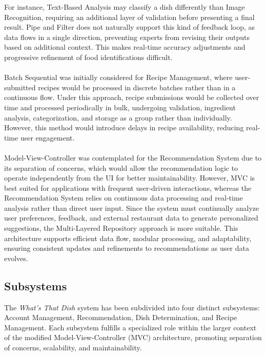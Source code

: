 \documentclass[]{article}
\begin{document}
For instance, Text-Based Analysis may classify a dish differently than Image Recognition, requiring an additional layer of validation before presenting a final result. 
Pipe and Filter does not naturally support this kind of feedback loop, as data flows in a single direction, preventing experts from revising their outputs based on additional context.
This makes real-time accuracy adjustments and progressive refinement of food identifications difficult.
\\
\\
Batch Sequential was initially considered for Recipe Management, where user-submitted recipes would be processed in discrete batches rather than in a continuous flow. 
Under this approach, recipe submissions would be collected over time and processed periodically in bulk, undergoing validation, ingredient analysis, categorization, and storage as a group rather than individually. 
However, this method would introduce delays in recipe availability, reducing real-time user engagement. 
\\
\\
Model-View-Controller was contemplated for the Recommendation System due to its separation of concerns, which would allow the recommendation logic to operate independently from the UI for better maintainability.
However, MVC is best suited for applications with frequent user-driven interactions, whereas the Recommendation System relies on continuous data processing and real-time analysis rather than direct user input. 
Since the system must continually analyze user preferences, feedback, and external restaurant data to generate personalized suggestions, the Multi-Layered Repository approach is more suitable. 
This architecture supports efficient data flow, modular processing, and adaptability, ensuring consistent updates and refinements to recommendations as user data evolves.

\subsection{Subsystems}
\label{sub:subsystems}

The \textit{What’s That Dish} system has been subdivided into four distinct subsystems: Account Management, Recommendation, Dish Determination, and Recipe Management. Each subsystem fulfills a specialized role within the larger context of the modified Model-View-Controller (MVC) architecture, promoting separation of concerns, scalability, and maintainability.
\end{document}
